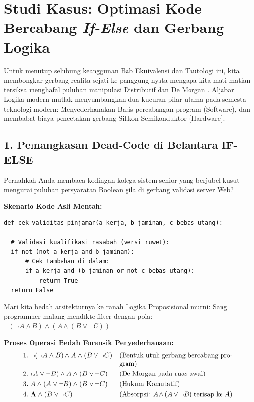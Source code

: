 \section{Studi Kasus: Optimasi Kode Bercabang \textit{If-Else} dan Gerbang Logika}

Untuk menutup selubung keanggunan Bab Ekuivalensi dan Tautologi ini, kita membongkar gerbang realita sejati ke panggung nyata mengapa kita mati-matian tersiksa menghafal puluhan manipulasi Distributif dan De Morgan \cite{rosen2019}. Aljabar Logika modern mutlak menyumbangkan dua kucuran pilar utama pada semesta teknologi modern: Menyederhanakan Baris percabangan program (Software), dan membabat biaya pencetakan gerbang Silikon Semikonduktor (Hardware).

\subsection{1. Pemangkasan Dead-Code di Belantara IF-ELSE}

Pernahkah Anda membaca kodingan kolega sistem senior yang berjubel kusut mengurai puluhan persyaratan Boolean gila di gerbang validasi server Web?

\textbf{Skenario Kode Asli Mentah:}
\begin{lstlisting}[style=pythonstyle]
def cek_validitas_pinjaman(a_kerja, b_jaminan, c_bebas_utang):
  
  # Validasi kualifikasi nasabah (versi ruwet):
  if not (not a_kerja and b_jaminan):
      # Cek tambahan di dalam:
      if a_kerja and (b_jaminan or not c_bebas_utang):
          return True
  return False
\end{lstlisting}

Mari kita bedah arsitekturnya ke ranah Logika Proposisional murni:
Sang programmer malang mendikte filter dengan pola: $\neg(\neg A \wedge B) \wedge (A \wedge (B \vee \neg C))$

\textbf{Proses Operasi Bedah Forensik Penyederhanaan:}
\begin{align*}
    1.\ & \neg(\neg A \wedge B) \wedge A \wedge (B \vee \neg C) & \text{\parbox[t]{5.8cm}{(Bentuk utuh gerbang bercabang program)}} \\
    2.\ & (A \vee \neg B) \wedge A \wedge (B \vee \neg C) & \text{\parbox[t]{5.8cm}{(De Morgan pada ruas awal)}} \\
    3.\ & A \wedge (A \vee \neg B) \wedge (B \vee \neg C) & \text{\parbox[t]{5.8cm}{(Hukum Komutatif)}} \\
    4.\ & \mathbf{A} \wedge (B \vee \neg C) & \text{\parbox[t]{5.8cm}{(Absorpsi: $A \wedge (A \vee \neg B)$ terisap ke $A$)}}
\end{align*}

